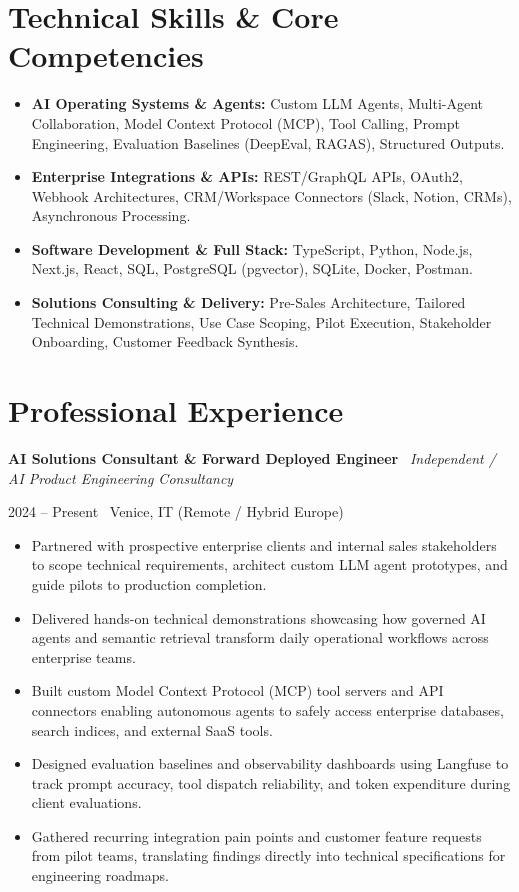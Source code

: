 \documentclass[a4paper,10pt]{article}
\newcommand{\role}[4]{%
  \vspace{2pt}\noindent
  \begin{minipage}[t]{0.70\textwidth}\raggedright\textbf{#1} \textbullet\ \textit{#3}\end{minipage}%
  \hfill
  \begin{minipage}[t]{0.28\textwidth}\raggedleft\footnotesize\color{gray}#2 \textbullet\ #4\end{minipage}%
  \vspace{1pt}%
}
\begin{document}
\section{Technical Skills \& Core Competencies}
\begin{itemize}[leftmargin=1.2em, itemsep=2pt]
  \item \textbf{AI Operating Systems \& Agents:} Custom LLM Agents, Multi-Agent Collaboration, Model Context Protocol (MCP), Tool Calling, Prompt Engineering, Evaluation Baselines (DeepEval, RAGAS), Structured Outputs.
  \item \textbf{Enterprise Integrations \& APIs:} REST/GraphQL APIs, OAuth2, Webhook Architectures, CRM/Workspace Connectors (Slack, Notion, CRMs), Asynchronous Processing.
  \item \textbf{Software Development \& Full Stack:} TypeScript, Python, Node.js, Next.js, React, SQL, PostgreSQL (pgvector), SQLite, Docker, Postman.
  \item \textbf{Solutions Consulting \& Delivery:} Pre-Sales Architecture, Tailored Technical Demonstrations, Use Case Scoping, Pilot Execution, Stakeholder Onboarding, Customer Feedback Synthesis.
\end{itemize}

\section{Professional Experience}

\role{AI Solutions Consultant \& Forward Deployed Engineer}{2024 -- Present}{Independent / AI Product Engineering Consultancy}{Venice, IT (Remote / Hybrid Europe)}
\begin{itemize}
  \item Partnered with prospective enterprise clients and internal sales stakeholders to scope technical requirements, architect custom LLM agent prototypes, and guide pilots to production completion.
  \item Delivered hands-on technical demonstrations showcasing how governed AI agents and semantic retrieval transform daily operational workflows across enterprise teams.
  \item Built custom Model Context Protocol (MCP) tool servers and API connectors enabling autonomous agents to safely access enterprise databases, search indices, and external SaaS tools.
  \item Designed evaluation baselines and observability dashboards using Langfuse to track prompt accuracy, tool dispatch reliability, and token expenditure during client evaluations.
  \item Gathered recurring integration pain points and customer feature requests from pilot teams, translating findings directly into technical specifications for engineering roadmaps.
\end{itemize}
\end{document}
